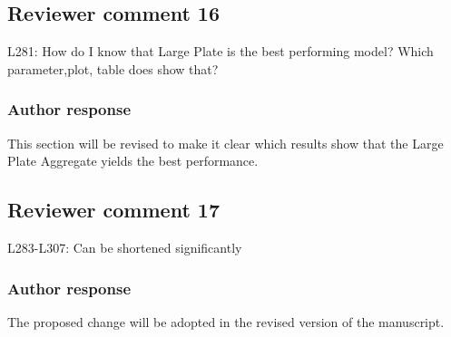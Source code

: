 \documentclass[11pt]{scrartcl}
\begin{document}
\subsection{Reviewer comment 16}

L281: How do I know that Large Plate is the best performing model? Which parameter,plot, table does show that?

\subsubsection*{Author response}

This section will be revised to make it clear which results show that
the Large Plate Aggregate yields the best performance.

\subsection*{Reviewer comment 17}
L283-L307: Can be shortened significantly

\subsubsection*{Author response}

The proposed change will be adopted in the revised version of the manuscript.

%
%
%
\end{document}
